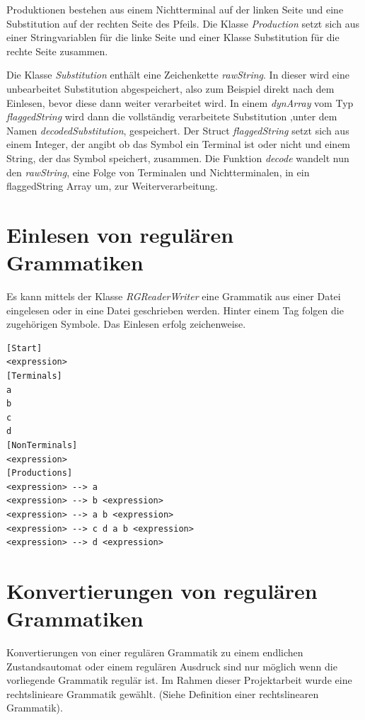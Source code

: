 Produktionen bestehen aus einem Nichtterminal auf der linken Seite und eine
Substitution auf der rechten Seite des Pfeils. Die Klasse \textit{Production}
setzt sich aus einer Stringvariablen für die linke Seite und einer Klasse
Substitution für die rechte Seite zusammen.

Die Klasse \textit{Substitution} enthält eine Zeichenkette \textit{rawString}.
In dieser wird eine unbearbeitet Substitution abgespeichert, also zum Beispiel
direkt nach dem Einlesen, bevor diese dann weiter verarbeitet wird. In einem
\textit{dynArray} vom Typ \textit{flaggedString} wird dann die vollständig
verarbeitete Substitution ,unter dem Namen \textit{decodedSubstitution},
gespeichert. Der Struct \textit{flaggedString} setzt sich aus einem Integer,
der angibt ob das Symbol ein Terminal ist oder nicht und einem String, der das
Symbol speichert, zusammen. Die Funktion \textit{decode} wandelt nun den
\textit{rawString}, eine Folge von Terminalen und Nichtterminalen, in ein
flaggedString Array um, zur Weiterverarbeitung.

\section{Einlesen von regulären Grammatiken}

Es kann mittels der Klasse \textit{RGReaderWriter} eine Grammatik aus einer
Datei eingelesen oder in eine Datei geschrieben werden. Hinter einem Tag folgen die
zugehörigen Symbole. Das Einlesen erfolg zeichenweise.

\lstset{language=C, basicstyle=\footnotesize}
\begin{lstlisting}[float=h!, frame=tb, captionpos=b, caption={Beispiel zu
einem Textdatei der einen Grammatik darstellt.}, label=list:TextGrammar]
[Start]
<expression>
[Terminals]
a
b
c
d
[NonTerminals]
<expression>
[Productions]
<expression> --> a
<expression> --> b <expression>
<expression> --> a b <expression>
<expression> --> c d a b <expression>
<expression> --> d <expression>
\end{lstlisting}
 
\section{Konvertierungen von regulären Grammatiken}

Konvertierungen von einer regulären Grammatik zu einem endlichen Zustandsautomat
oder einem regulären Ausdruck sind nur möglich wenn die vorliegende Grammatik
regulär ist. Im Rahmen dieser Projektarbeit wurde eine rechtslinieare Grammatik gewählt.
(Siehe Definition einer rechtslinearen Grammatik).

